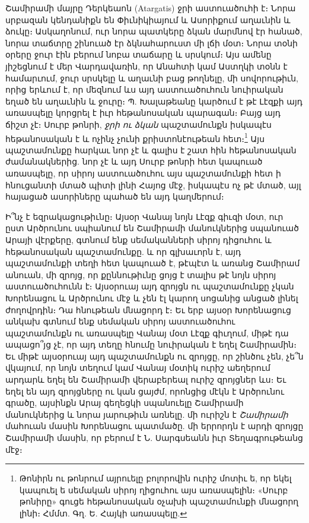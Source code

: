 \documentclass{article}
\begin{document}
{Շամիրամի մայրը Դերկեաոն (Atargatis) ջրի աստուածուհի է։ Նորա սրբազան կենդանիքն են Փիւնիկիայում և Ասորիքում աղաւնին և ձուկը։ Ասկաղոնում, ուր նորա պատկերը ձկան մարմնով էր հանած, նորա տաճտրը շինուած էր ձկնահարուստ մի լճի մօտ։ Նորա տօնի օրերը ջուր էին բերում նոբա տաճարը և սրսկում։ Այս ամենը յիշեցնում է մեր Վարդավառին, որ Անահտի կամ Աստղկի տօնն է համարւում, ջուր սրսկելը և աղաւնի բաց թողնելը, մի սովորութիւն, որից երևում է, որ մեզնում ևս այդ աստուածուհուն նուիրական եղած են աղաւնին և ջուրը։ Պ. Խալաթեանը կարծում է թէ Լէզքի այդ առասպելը կորցրել է իւր հեթանոսական պարագան։ Բայց այդ ճիշտ չէ։ Սուրբ թոնրի, \emph{ջրի ու ձկան} պաշտամունքն իսկապէս հեթանոսական է և ոչինչ չունի քրիստոնէութեան հետ։\footnote{Թոնիրն ու թոնրում այրուելը բոլորովին ուրիշ մոտիւ ե, որ եկել կապուել ե սեմական սիրոյ ղիցուհու այս առասպելին։ «Սուրբ թոնիրը» գուցե հեթանոսական օչախի պաշտամունքի մնացորղ լինի։ Հմմտ. Գղ. Ե. Հայկի առասպելը.} Այս պաշտամունքը հարկաւ նոր չէ և գալիս է շատ հին հեթանոսական ժամանակներից. նոր չէ և այդ Սուրբ թոնրի հետ կապուած առասպելը, որ սիրոյ աստուածուհու այս պաշտամունքի հետ ի հնուցանտի մտած պիտի լինի Հայոց մէջ, իսկապէս ոչ թէ մտած, այլ հայացած ասորիները պահած են այդ կաղմերում։

Ի՞նչ է եզրակացութիւնը։ Այսօր Վանայ նոյն Լէզք գիւզի մօտ, ուր ըստ Արծրունու սպիանում են Շամիրամի մանուկներից սպանուած Արայի վէրքերը, գտնում ենք սեմականների սիրոյ դիցուհու և հեթանոսական պաշտամունքը. և որ գլխաւորն է, այդ պաշտամունքի տեղի հետ կապուած է, թէպէտ և առանց Շամիրամ անուան, մի զրոյց, որ քըննութիւնը ցոյց է տալիս թէ նոյն սիրոյ աստուածուհունն է։ Այսօրուայ այդ զրոյցն ու պաշտամունքը չկան Խորենացու և Արծրունու մէջ և չեն էլ կարող սոցանից անցած լինել ժողովրդին։ Դա հնութեան մնացորդ է։ Եւ երբ այսօր Խորենացուց անկախ գտնում ենք սեմական սիրոյ աստուածուհու պաշտամունքն ու առասպելը Վանայ մօտ Լէզք գիւղում, միթէ դա ապացո՞յց չէ, որ այդ տեղը հնումը նուիրական է եղել Շամիրամին։ Եւ միթէ այսօրուայ այդ պաշտամունքն ու զրոյցը, որ շինծու չեն, չե՞ն վկայում, որ նոյն տեղում կամ Վանայ մօտիկ ուրիշ աեղերում արդարև եղել են Շամիրամի վերաբերեալ ուրիշ զրոյցներ ևս։ Եւ եղել են այդ զրոյցները ու կան ցայժմ, որոնցից մէկն է Արծրունու գրածը, այսինքն Արայ գեղեցկի սպանուելը Շամիրամի մանուկներից և նորա յարութիւն առնելը. մի ուրիշն է \emph{Շամիրամի} մահուան մասին Խորենացու պատմածը. մի երրորդն է արդի զրոյցը Շամիրամի մասին, որ բերում է Ն. Սարգսեանն իւր Տեղագրութեանց մէջ։

}
\end{document}
